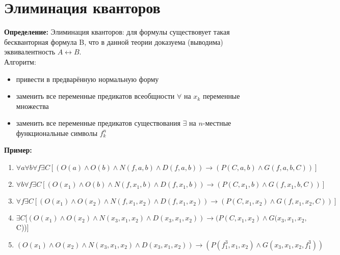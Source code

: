 \documentclass[../main.tex]{subfiles}
\begin{document}
\section{Элиминация кванторов}
\textbf{Определение:
} Элиминация кванторов: для формулы существовует такая бескванторная формула B, что в данной теории доказуема (выводима) эквивалентность $A\leftrightarrow B$. \\
Алгоритм:
\begin{itemize}
	\item привести в предварённую нормальную форму
	\item заменить все переменные предикатов всеобщности $\forall$ на $x_k$ переменные множества
	\item заменить все переменные предикатов существования $\exists$ на $n$-местные функциональные символы $f_{k}^n$
\end{itemize}
\textbf{Пример:
}\begin{enumerate}
	\item $\forall a \forall b \forall f \exists C[ (O(a)   \land  O(b)   \land  N(f,a,b)   \land  D(f,a,b)) \to (P(C,a,b)   \land  G(f,a,b,C))]$
	\item $\forall b \forall f \exists C[ (O(x_1 )   \land  O(b)   \land  N(f,x_1,b)   \land  D(f,x_1,b)) \to (P(C,x_1,b)   \land  G(f,x_1,b,C))]$
	\item $\forall f \exists C[ (O(x_1 )   \land  O(x_2 )   \land  N(f,x_1,x_2 )   \land  D(f,x_1,x_2 )) \to (P(C,x_1,x_2 )   \land  G(f,x_1,x_2,C))]$
	\item  $\exists C[ (O(x_1 )   \land  O(x_2 )   \land  N(x_3,x_1,x_2 )   \land  D(x_3,x_1,x_2 )) \to (P(C,x_1,x_2 )   \land  G(x_3,x_1,x_2,$C))]
	\item $(O(x_1 )   \land  O(x_2 )   \land  N(x_3,x_1,x_2 )   \land D(x_3,x_1,x_2 )) \to (P(f_{1}^3,x_1,x_2 )   \land  G(x_3,x_1,x_2,f_{1}^3 ))$
	
\end{enumerate}

\end{document}
